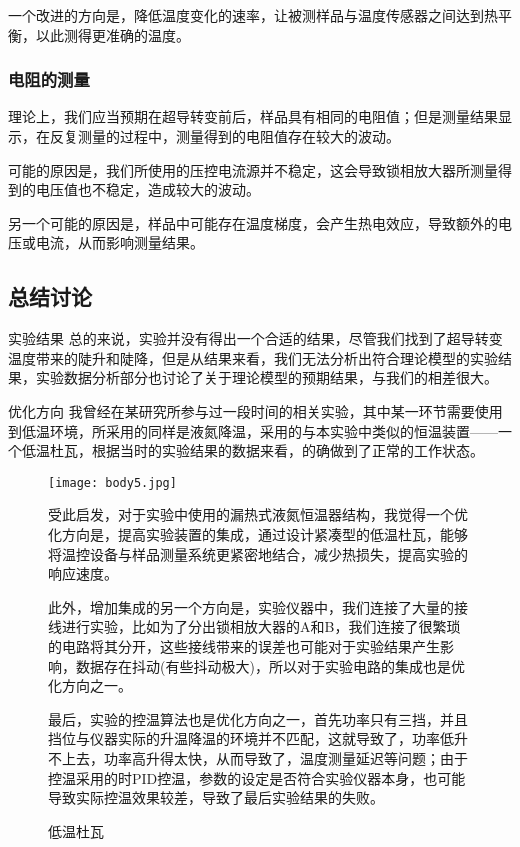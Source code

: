 一个改进的方向是，降低温度变化的速率，让被测样品与温度传感器之间达到热平衡，以此测得更准确的温度。

\subsubsection{电阻的测量}

理论上，我们应当预期在超导转变前后，样品具有相同的电阻值；但是测量结果显示，在反复测量的过程中，测量得到的电阻值存在较大的波动。

可能的原因是，我们所使用的压控电流源并不稳定，这会导致锁相放大器所测量得到的电压值也不稳定，造成较大的波动。

另一个可能的原因是，样品中可能存在温度梯度，会产生热电效应，导致额外的电压或电流，从而影响测量结果。



\subsection{总结讨论}

\begin{ubox}{实验结果}
	\quad \quad 总的来说，实验并没有得出一个合适的结果，尽管我们找到了超导转变温度带来的陡升和陡降，但是从结果来看，我们无法分析出符合理论模型的实验结果，实验数据分析部分也讨论了关于理论模型的预期结果，与我们的相差很大。
\end{ubox}
\begin{ubox}{优化方向}
	\quad \quad 我曾经在某研究所参与过一段时间的相关实验，其中某一环节需要使用到低温环境，所采用的同样是液氮降温，采用的与本实验中类似的恒温装置——一个低温杜瓦，根据当时的实验结果的数据来看，的确做到了正常的工作状态。
    \begin{figure}[H]
        \centering
        \begin{minipage}{0.3\textwidth} %
            \centering
            \texttt{[image: body5.jpg]}
            \caption{低温杜瓦}
        \end{minipage}%
        \hfill
        \begin{minipage}{0.55\textwidth} %
			\quad \quad 受此启发，对于实验中使用的漏热式液氮恒温器结构，我觉得一个优化方向是，提高实验装置的集成，通过设计紧凑型的低温杜瓦，能够将温控设备与样品测量系统更紧密地结合，减少热损失，提高实验的响应速度。
            
			\quad \quad 此外，增加集成的另一个方向是，实验仪器中，我们连接了大量的接线进行实验，比如为了分出锁相放大器的A和B，我们连接了很繁琐的电路将其分开，这些接线带来的误差也可能对于实验结果产生影响，数据存在抖动(有些抖动极大)，所以对于实验电路的集成也是优化方向之一。

            \quad \quad 最后，实验的控温算法也是优化方向之一，首先功率只有三挡，并且挡位与仪器实际的升温降温的环境并不匹配，这就导致了，功率低升不上去，功率高升得太快，从而导致了，温度测量延迟等问题；由于控温采用的时PID控温，参数的设定是否符合实验仪器本身，也可能导致实际控温效果较差，导致了最后实验结果的失败。
        \end{minipage}
    \end{figure}
\end{ubox}




